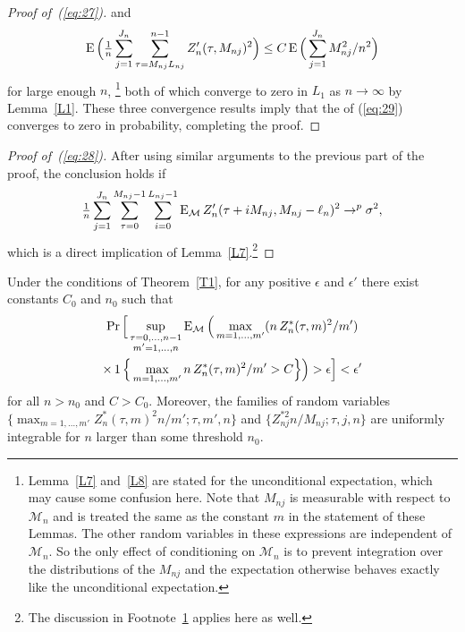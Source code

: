 \documentclass[11pt]{article}
\begin{document}
\begin{proof}[Proof of~(\ref{eq:27})]
  and
  \begin{equation*}
    \operatorname{E} \Big(\tfrac{1}{n} \sum_{j=1}^{J_n} \sum_{\tau= M_{nj}L_{nj}}^{n-1} Z_{n}'(\tau, M_{nj})^2\Big)
    \leq
    C \operatorname{E} \Big(\sum_{j=1}^{J_n} M_{nj}^2 / n^2 \Big)
  \end{equation*}
  for large enough $n$,%
\footnote{Lemma~\ref{L7}
  and~\ref{L8} are stated for the
  unconditional expectation, which may cause some confusion here. Note
  that $M_{nj}$ is measurable with respect to $\mathcal{M}_n$ and
  is treated the same as the constant $m$ in the statement of
  these Lemmas.  The other random variables in
  these expressions are independent of $\mathcal{M}_n$. So the only
  effect of conditioning on $\mathcal{M}_n$ is to prevent integration
  over the distributions of the $M_{nj}$ and the expectation otherwise
  behaves exactly like the unconditional expectation.\label{f:1}} %
  both of which converge to zero in $L_1$ as $n \to \infty$ by
  Lemma~\ref{L1}.  These three convergence
  results imply that the  of (\ref{eq:29}) converges to
  zero in probability, completing the proof.
\end{proof}

\begin{proof}[Proof of~(\ref{eq:28})]
  After using similar arguments to the previous part of the proof,
  the conclusion holds if
  \begin{equation*}
    \tfrac{1}{n} \sum_{j=1}^{J_n} \sum_{\tau=0}^{M_{nj}-1} \sum_{i=0}^{L_{nj} - 1}
    \operatorname{E}_{\mathcal{M}} Z_n'(\tau + i M_{nj}, M_{nj} - \ell_n)^2 \to^p \sigma^2,
  \end{equation*}
  which is a direct implication of
  Lemma~\ref{L7}.\footnote{%
    The discussion in Footnote~\ref{f:1} applies here as well.}
\end{proof}

\begin{lem}\label{L6}
  Under the conditions of Theorem~\ref{T1}, for any positive
  $\epsilon$ and $\epsilon'$ there exist constants $C_0$ and $n_0$
  such that
  \begin{multline}\label{eq:30}
    \operatorname{Pr} \Big [ \sup_{\substack{\tau = 0,\dots,n-1 \\ m'=1,\dots,n}}
    \operatorname{E}_{\mathcal{M}} \Big ( \max_{ m = 1, \dots, m' } (n \, Z^*_n(\tau, m)^2 / m' ) \\
    \times \operatorname{1}\Big\{\max_{m = 1,\dots,m'} n \, Z^*_n(\tau, m)^2 / m' > C\Big\}\Big)
    > \epsilon \Big ] < \epsilon'
  \end{multline}
  for all $n > n_0$ and $C > C_0$.
  Moreover, the families of random variables \\
  $\{\max_{m=1,\dots,m'} Z^{*}_n(\tau, m)^2 n / m'; \tau, m', n\}$ and
  $\{Z^{*2}_{nj} n / M_{nj}; \tau, j, n\}$ are
  uniformly integrable for $n$ larger than some threshold $n_0$.
\end{lem}
\end{document}
